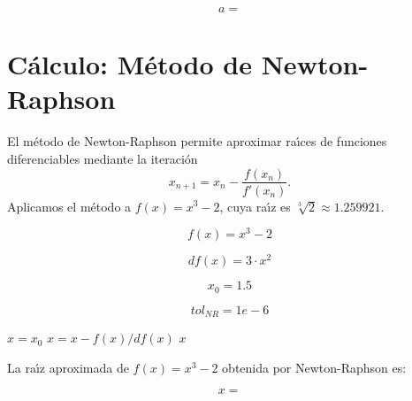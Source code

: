 \documentclass{article}
\begin{document}
\begin{equation}
    a = 
    \label{eq:res:a}
\end{equation}



\section{C\'alculo: M\'etodo de Newton-Raphson}

El m\'etodo de Newton-Raphson permite aproximar ra\'{\i}ces de funciones diferenciables
mediante la iteraci\'on 
\begin{equation}
    x_{n+1} = x_n - \frac{f(x_n)}{f'(x_n)}.
\end{equation}
Aplicamos el m\'etodo a $f(x) = x^3 - 2$, cuya ra\'{\i}z es $\sqrt[3]{2} \approx 1.259921$.

\begin{equation}
    f(x) = x^3 - 2
    \label{eq:calc:f}
\end{equation}

\begin{equation}
    df(x) = 3 \cdot x^2
    \label{eq:calc:df}
\end{equation}

\begin{equation}
    x_0 = 1.5
    \label{eq:calc:x0}
\end{equation}

\begin{equation}
    tol_{NR} = 1e-6
    \label{eq:calc:tolNR}
\end{equation}

\begin{algorithm}
\caption{M\'etodo de Newton-Raphson para $f(x) = x^3 - 2$}
\label{alg:calc:x}
\begin{algorithmic}
    \STATE $x = x_0$
        \STATE $x = x - f(x) / df(x)$
    \ENDWHILE
    \RETURN $x$
\end{algorithmic}
\end{algorithm}

La ra\'{\i}z aproximada de $f(x) = x^3 - 2$ obtenida por Newton-Raphson es:

\begin{equation}
    x =
    \label{eq:res:x}
\end{equation}
\end{document}
